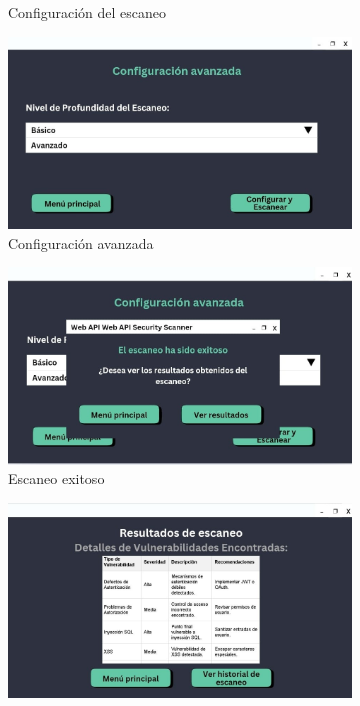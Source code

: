 \documentclass{article}
\begin{document}
\begin{figure}[ht]
\begin{subfigure}[b]{0.35\textwidth}
            \caption{Configuración del escaneo}
        \end{subfigure}
        \begin{subfigure}[b]{0.35\textwidth}
            \centering
            \includegraphics[width=\textwidth]{Demo5.jpg}
            \caption{Configuración avanzada}
        \end{subfigure}
        \begin{subfigure}[b]{0.35\textwidth}
            \centering
            \includegraphics[width=\textwidth]{Demo4.jpg}
            \caption{Escaneo exitoso}
        \end{subfigure}
        \begin{subfigure}[b]{0.35\textwidth}
            \centering
            \includegraphics[width=\textwidth]{Demo3.jpg}

\end{subfigure}
\end{figure}
\end{document}

